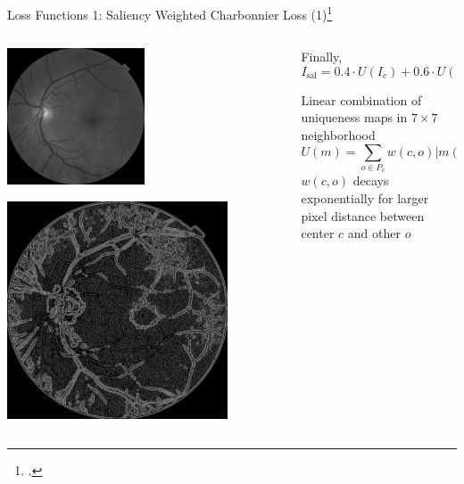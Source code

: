 \documentclass{beamer}
\begin{document}
\begin{frame}{Loss Functions 1: Saliency Weighted Charbonnier Loss (1)\footcite{SaliencyGAN}}
\begin{columns}
  \begin{column}{0.5\linewidth}
      \centering
      \includegraphics[width=0.5\textwidth]{saliency_gt}

      \includegraphics[width=0.8\textwidth]{saliency_full}
  \end{column}
  \begin{column}{0.6\linewidth}

Finally,
\begin{equation}
  \label{eq:saliency}
  I_{\text{sal}} = 0.4 \cdot U(I_c) + 0.6 \cdot U(1 - I_e)
\end{equation}

Linear combination of uniqueness  maps in $7 \times 7$ neighborhood
 \begin{equation}
  \label{eq:uniq}
  U(m) = \sum_{o \in P_c} w(c, o) \vert m(c) - m(o) \vert
\end{equation}
$w(c, o)$ decays exponentially for larger pixel distance between center $c$ and other $o$ 

\end{column} 
\end{columns}
\end{frame}
\end{document}
